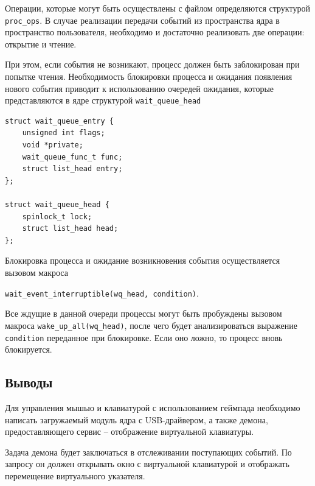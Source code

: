 Операции, которые могут быть осуществлены с файлом определяются структурой \texttt{proc\_ops}. В случае реализации передачи событий из пространства ядра в пространство пользователя, необходимо и достаточно реализовать две операции: открытие и чтение.

При этом, если события не возникают, процесс должен быть заблокирован при попытке чтения. Необходимость блокировки процесса и ожидания появления нового события приводит к использованию очередей ожидания, которые представляются в ядре структурой \texttt{wait\_queue\_head}

\begin{small}
\begin{verbatim}
struct wait_queue_entry {
    unsigned int flags;
    void *private;
    wait_queue_func_t func;
    struct list_head entry;
};

struct wait_queue_head {
    spinlock_t lock;
    struct list_head head;
};
\end{verbatim}
\end{small}

Блокировка процесса и ожидание возникновения события осуществляется вызовом макроса

\texttt{wait\_event\_interruptible(wq\_head, condition)}.

Все ждущие в данной очереди процессы могут быть пробуждены вызовом макроса \texttt{wake\_up\_all(wq\_head)}, после чего будет анализироваться выражение \texttt{condition} переданное при блокировке. Если оно ложно, то процесс вновь блокируется.

\subsection*{Выводы}

Для управления мышью и клавиатурой с использованием геймпада необходимо написать загружаемый модуль ядра с USB-драйвером, а также демона, предоставляющего сервис -- отображение виртуальной клавиатуры.


Задача демона будет заключаться в отслеживании поступающих событий. По запросу он должен открывать окно с виртуальной клавиатурой и отображать перемещение виртуального указателя.

\pagebreak
